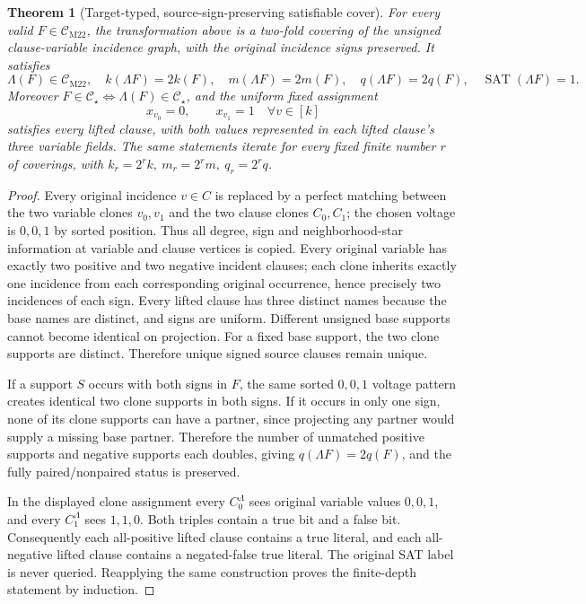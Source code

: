 \documentclass[11pt]{article}
\newtheorem{theorem}{Theorem}
\newcommand{\CM}{\mathcal C_{\mathrm{M22}}}
\newcommand{\CS}{\mathcal C_\star}
\begin{document}
\begin{theorem}[Target-typed, source-sign-preserving satisfiable cover]
For every valid \(F\in\CM\), the transformation above is a
two-fold covering of the unsigned clause-variable incidence graph,
with the original incidence signs preserved. It satisfies
\[
\Lambda(F)\in\CM,\quad
k(\Lambda F)=2k(F),\quad m(\Lambda F)=2m(F),\quad
q(\Lambda F)=2q(F),
\quad \operatorname{SAT}(\Lambda F)=1.
\]
Moreover \(F\in\CS\iff\Lambda(F)\in\CS\), and the uniform fixed
assignment
\[
\boxed{x_{v_0}=0,\qquad x_{v_1}=1\quad\forall v\in[k]}
\]
satisfies every lifted clause, with both values represented in each
lifted clause's three variable fields. The same statements iterate
for every fixed finite number \(r\) of coverings, with
\(k_r=2^rk,\ m_r=2^rm,\ q_r=2^rq\).
\end{theorem}
\begin{proof}
Every original incidence \(v\in C\) is replaced by a perfect matching
between the two variable clones \(v_0,v_1\) and the two clause clones
\(C_0,C_1\); the chosen voltage is \(0,0,1\) by sorted position.
Thus all degree, sign and neighborhood-star information at variable and
clause vertices is copied.  Every original variable has exactly two
positive and two negative incident clauses; each clone inherits exactly
one incidence from each corresponding original occurrence, hence precisely
two incidences of each sign. Every lifted clause has three distinct
names because the base names are distinct, and signs are uniform.
Different unsigned base supports cannot become identical on projection.
For a fixed base support, the two clone supports are distinct.
Therefore unique signed source clauses remain unique.

If a support \(S\) occurs with both signs in \(F\), the same sorted
\(0,0,1\) voltage pattern creates identical two clone supports
in both signs. If it occurs in only one sign, none of its clone supports
can have a partner, since projecting any partner would supply a missing
base partner.  Therefore the number of unmatched positive supports and
negative supports each doubles, giving \(q(\Lambda F)=2q(F)\),
and the fully paired/nonpaired status is preserved.

In the displayed clone assignment every \(C_0^\Lambda\) sees original
variable values \(0,0,1\), and every \(C_1^\Lambda\) sees \(1,1,0\).
Both triples contain a true bit and a false bit.
Consequently each all-positive lifted clause contains a true literal,
and each all-negative lifted clause contains a negated-false true literal.
The original SAT label is never queried. Reapplying the same construction
proves the finite-depth statement by induction.
\end{proof}
\end{document}
